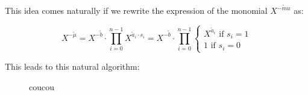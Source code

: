 This idea comes naturally if we rewrite the expression of the monomial $X^{-\tilde mu}$ as:

\[
	X^{-\tilde \mu} = X^{-\tilde b} \cdot \prod_{i=0}^{n-1} X^{\tilde a_i \cdot s_i} = X^{-\tilde b} \cdot \prod_{i=0}^{n-1} \begin{cases}
		X^{\tilde a_i} \text{ if } s_i = 1\\
		1 \text{ if } s_i = 0
	\end{cases}
\]


This leads to this natural algorithm:





\begin{figure}
	\centering
	\cmuxScratchpad
	\caption{coucou}
\end{figure}
